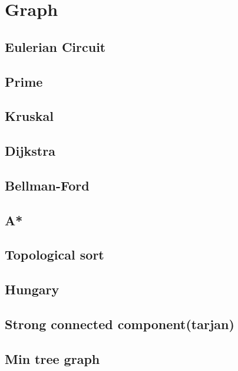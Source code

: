 \newpage
\section{Graph}

\subsection{Eulerian Circuit}


\subsection{Prime}


\subsection{Kruskal}


\subsection{Dijkstra}


\subsection{Bellman-Ford}


\subsection{A*}
\subsection{Topological sort}


\subsection{Hungary}


\subsection{Strong connected component(tarjan)}


\subsection{Min tree graph}
